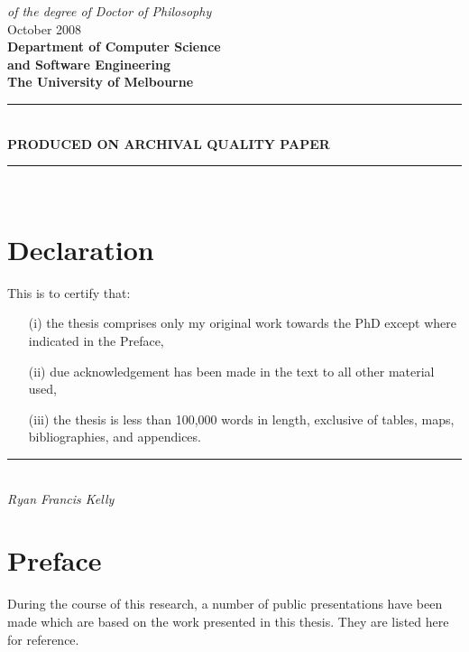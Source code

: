 \begin{titlepage}
\begin{center}
{\em\large        of the degree of Doctor of Philosophy     }\\
\vspace{0.5cm}
{\Large             October 2008        }\\
\vspace{2cm}
{\bf\large Department of Computer Science\\ and Software Engineering}\\ \vspace{0.5cm}
{\bf\Large        The University of Melbourne     }\\
\vspace{1.7cm}
{\color{darkgrey}\rule{11cm}{0.2mm}}\\
\vspace{2mm}
{\color{darkgrey}\bf\large PRODUCED ON ARCHIVAL QUALITY PAPER}\\
{\color{darkgrey}\rule{11cm}{0.2mm}}\\
\vspace{0.5cm}
\end{center}
\end{titlepage}

\cleardoublepage
{}



\chapter*{Declaration}
This is to certify that:
\begin{itemize}
\item[(i)] the thesis comprises only my original work towards the PhD except where indicated in the Preface,
\item[(ii)] due acknowledgement has been made in the text to all other material used,
\item[(iii)] the thesis is less than 100,000 words in length, exclusive of tables, maps, bibliographies, and appendices.
\end{itemize}
\vspace{3cm}
\rule{70mm}{0.1mm}\\
\emph{Ryan Francis Kelly}

\chapter*{Preface}
During the course of this research, a number of public presentations have been
 made which are based on the work presented in this thesis. They are listed
 here for reference.

